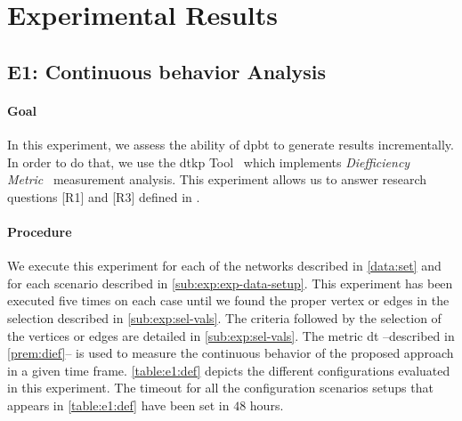 \section{Experimental Results}\label{sec:exp:observed-results}
\subsection{E1: Continuous behavior Analysis}\label{sub:sec:exp-1} 
\paragraph{Goal} In this experiment, we assess the ability of \acrshort{dpbt} to generate results incrementally.
In order to do that, we use the \acrlong{dtkp} Tool~\cite{diefpy} which implements \emph{Diefficiency Metric}~\cite{diefpaper} measurement analysis.
This experiment allows us to answer research questions [R1] and [R3] defined in . 

\paragraph{Procedure} We execute this experiment for each of the networks described in \autoref{data:set} and for each scenario described in \autoref{sub:exp:exp-data-setup}.
This experiment has been executed five times on each case until we found the proper vertex or edges in the selection described in \autoref{sub:exp:sel-vals}. The criteria followed by the selection of the vertices or edges are detailed in \autoref{sub:exp:sel-vals}.
The metric \acrlong{dt} --described in \autoref{prem:dief}-- is used to measure the continuous behavior of the proposed approach in a given time frame.
\autoref{table:e1:def} depicts the different configurations evaluated in this experiment. The timeout for all the configuration scenarios setups that appears in \autoref{table:e1:def} have been set in $48$ hours.

